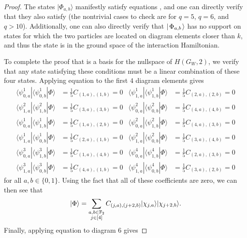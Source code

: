 \documentclass[../thesis-main/thesis-main]{subfiles}
\begin{document}
\begin{proof}
The states $|\Phi_{a,b}\rangle$ manifestly satisfy equations , and one can directly verify that they also satisfy  (the nontrivial cases to check are for $q=5$, $q=6$, and $q>10$).  Additionally, one can also directly verify that $|\mspace{2mu} \Phi_{a,b} \mspace{2mu} \rangle$ has no support on states for which the two particles are located on diagram elements closer than $k$, and thus the state is in the ground space of the interaction Hamiltonian.

To complete the proof that  is a basis for the nullspace of $H(G_W,2)$, we verify that any state satisfying these conditions must be a linear combination of these four states. Applying equation  to the first $4$ diagram elements gives
\begin{align}
\langle\psi_{0,a}^{1}|\langle\psi_{0,b}^{1}|\Phi\rangle & =\frac{1}{5} C_{(1,a),(1,b)}=0 &
\langle\psi_{1,a}^{1}|\langle\psi_{1,b}^{1}|\Phi\rangle & =\frac{1}{5} C_{(2,a),(2,b)}=0\\
\langle\psi_{1,a}^{2}|\langle\psi_{1,b}^{2}|\Phi\rangle & =\frac{1}{5} C_{(3,a),(3,b)}=0 &
\langle\psi_{0,a}^{2}|\langle\psi_{0,b}^{2}|\Phi\rangle & =\frac{1}{5} C_{(4,a),(4,b)}=0\\
\langle\psi_{0,a}^{1}|\langle\psi_{1,b}^{1}|\Phi\rangle & =\frac{1}{5} C_{(1,a),(2,b)}=0 &
\langle\psi_{0,a}^{2}|\langle\psi_{1,b}^{2}|\Phi\rangle & =\frac{1}{5} C_{(4,a),(3,b)}=0\\
\langle\psi_{1,a}^{1}|\langle\psi_{0,b}^{1}|\Phi\rangle & =\frac{1}{5} C_{(2,a),(1,b)}=0 &
\langle\psi_{1,a}^{2}|\langle\psi_{0,b}^{2}|\Phi\rangle & =\frac{1}{5} C_{(3,a),(4,b)}=0\\
\langle\psi_{0,a}^{3}|\langle\psi_{1,b}^{3}|\Phi\rangle & =\frac{1}{5} C_{(1,a),(4,b)}=0 &
\langle\psi_{0,a}^{4}|\langle\psi_{1,b}^{4}|\Phi\rangle & =\frac{1}{5} C_{(2,a),(3,b)}=0\\
\langle\psi_{1,a}^{3}|\langle\psi_{0,b}^{3}|\Phi\rangle & =\frac{1}{5} C_{(4,a),(1,b)}=0 &
\langle\psi_{1,a}^{4}|\langle\psi_{0,b}^{4}|\Phi\rangle & =\frac{1}{5} C_{(3,a),(2,b)}=0
\end{align}
for all $a,b\in \{0,1\}$. Using the fact that all of these coefficients are zero, we can then see that
\begin{align}
|\Phi\rangle=\sum_{\substack{a,b\in\mathbb{F}_2\\ j\in [4]}}C_{(j,a),(j+2,b)}|\chi_{j,a}\rangle|\chi_{j+2,b}\rangle.
\end{align}
Finally, applying equation  to diagram $6$ gives

\end{proof}
\end{document}
